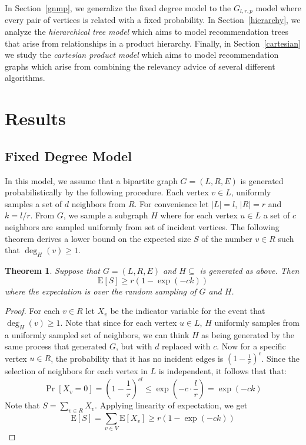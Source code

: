 \documentclass[]{article}
\newcommand{\E}{\text{E}}
\newtheorem{thm}{Theorem}
\begin{document}
In Section~\ref{gnmp}, we generalize the fixed degree model to the
$G_{l,r,p}$ model where every pair of vertices is related with a fixed
probability.  In Section~\ref{hierarchy}, we analyze the {\em
  hierarchical tree model} which aims to model recommendation trees
that arise from relationships in a product hierarchy. Finally, in
Section~\ref{cartesian} we study the {\em cartesian product model}
which aims to model recommendation graphs which arise from combining
the relevancy advice of several different algorithms.

\section{Results}
\subsection{Fixed Degree Model}
\label{fixed-degree}

In this model, we assume that a bipartite graph $G=(L,R,E)$ is
generated probabilistically by the following procedure. Each
vertex $v\in L$, uniformly samples a set of $d$ neighbors
from $R$. For convenience let $|L|=l$, $|R|=r$ and $k=l/r$. From
$G$, we sample a subgraph $H$ where for each vertex $u\in L$ a set of
$c$ neighbors are sampled uniformly from set of incident vertices. The
following theorem derives a lower bound on the expected size $S$ of the
number $v\in R$ such that $\deg_H(v) \geq 1$.

\begin{thm}
Suppose that $G=(L,R,E)$ and $H\subseteq$ is generated as above. Then
\[ \E[S] \geq r(1-\exp(-ck))\]
where the expectation is over the random sampling of $G$ and $H$.
\end{thm}
\begin{proof}
For each $v\in R$ let $X_v$ be the indicator variable for the event
that $\deg_H(v) \geq 1$. Note that since for each vertex $u\in L$, $H$
uniformly samples from a uniformly sampled set of neighbors, we can
think $H$ as being generated by the same process that generated $G$,
but with $d$ replaced with $c$. Now for a specific vertex $u \in R$,
the probability that it has no incident edges is 
$\left(1-\frac{1}{r}\right)^c$. Since the selection of neighbors for each 
vertex in $L$ is independent, it follows that that:
\[ \Pr[X_v=0] = \left(1-\frac{1}{r}\right)^{cl} \leq \exp\left(-c \cdot \frac{l}{r}\right) = \exp(-ck) \]
Note that $S = \sum_{v\in R} X_v$. Applying linearity of expectation, we get
\[ \E[S] = \sum_{v\in V} \E[X_v] \geq r(1-\exp(-ck))\]
\end{proof}
\end{document}
